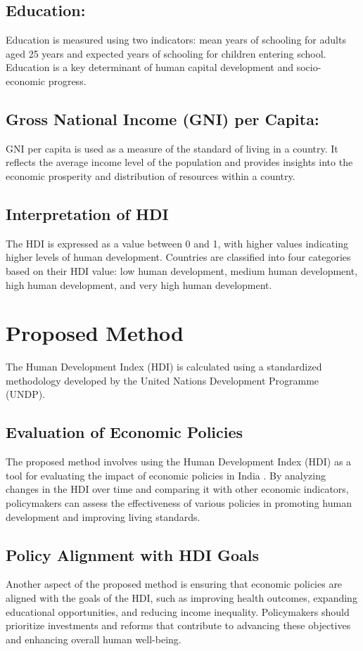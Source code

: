 \documentclass[12pt]{report}
\begin{document}
\subsection*{Education:} Education is measured using two indicators: mean years of schooling for adults aged 25 years and expected years of schooling for children entering school. Education is a key determinant of human capital development and socio-economic progress.\cite{future}

\subsection*{Gross National Income (GNI) per Capita:} GNI per capita is used as a measure of the standard of living in a country. It reflects the average income level of the population and provides insights into the economic prosperity and distribution of resources within a country.\cite{chat}
\subsection*{Interpretation of HDI} The HDI is expressed as a value between 0 and 1, with higher values indicating higher levels of human development. Countries are classified into four categories based on their HDI value: low human development, medium human development, high human development, and very high human development.



\newpage
\section*{Proposed Method}
The Human Development Index (HDI)\cite{the} is calculated using a standardized methodology developed by the United Nations Development Programme (UNDP).
\subsection*{Evaluation of Economic Policies}
The proposed method involves using the Human Development Index (HDI) as a tool for evaluating the impact of economic policies in India . By analyzing changes in the HDI over time and comparing it with other economic indicators, policymakers can assess the effectiveness of various policies in promoting human development and improving living standards.

\subsection*{Policy Alignment with HDI Goals}
Another aspect of the proposed method is ensuring that economic policies are aligned with the goals of the HDI, such as improving health outcomes, expanding educational opportunities, and reducing income inequality. Policymakers should prioritize investments and reforms that contribute to advancing these objectives and enhancing overall human well-being.
\end{document}
